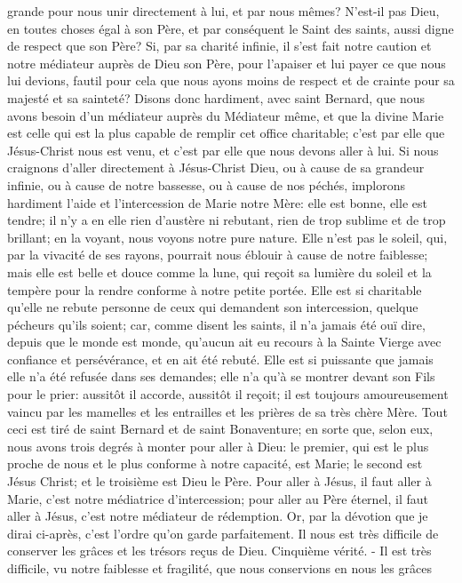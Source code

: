 grande pour nous unir directement à lui, et par nous mêmes? N'est-il pas Dieu, en toutes choses égal à son Père,
et par conséquent le Saint des saints, aussi digne de respect que son Père? Si, par sa charité infinie, il s'est fait
notre caution et notre médiateur auprès de Dieu son Père, pour l'apaiser et lui payer ce que nous lui devions, fautil pour cela que nous ayons moins de respect et de crainte pour sa majesté et sa sainteté?
Disons donc hardiment, avec saint Bernard, que nous avons besoin d'un médiateur auprès du Médiateur même, et
que la divine Marie est celle qui est la plus capable de remplir cet office charitable; c'est par elle que Jésus-Christ
nous est venu, et c'est par elle que nous devons aller à lui. Si nous craignons d'aller directement à Jésus-Christ
Dieu, ou à cause de sa grandeur infinie, ou à cause de notre bassesse, ou à cause de nos péchés, implorons
hardiment l'aide et l'intercession de Marie notre Mère: elle est bonne, elle est tendre; il n'y a en elle rien d'austère
ni rebutant, rien de trop sublime et de trop brillant; en la voyant, nous voyons notre pure nature. Elle n'est pas le
soleil, qui, par la vivacité de ses rayons, pourrait nous éblouir à cause de notre faiblesse; mais elle est belle et
douce comme la lune, qui reçoit sa lumière du soleil et la tempère pour la rendre conforme à notre petite portée.
Elle est si charitable qu'elle ne rebute personne de ceux qui demandent son intercession, quelque pécheurs qu'ils
soient; car, comme disent les saints, il n'a jamais été ouï dire, depuis que le monde est monde, qu'aucun ait eu
recours à la Sainte Vierge avec confiance et persévérance, et en ait été rebuté. Elle est si puissante que jamais
elle n'a été refusée dans ses demandes; elle n'a qu'à se montrer devant son Fils pour le prier: aussitôt il accorde,
aussitôt il reçoit; il est toujours amoureusement vaincu par les mamelles et les entrailles et les prières de sa très
chère Mère.
 Tout ceci est tiré de saint Bernard et de saint Bonaventure; en sorte que, selon eux, nous avons trois degrés à
monter pour aller à Dieu: le premier, qui est le plus proche de nous et le plus conforme à notre capacité, est Marie;
le second est Jésus Christ; et le troisième est Dieu le Père. Pour aller à Jésus, il faut aller à Marie, c'est notre
médiatrice d'intercession; pour aller au Père éternel, il faut aller à Jésus, c'est notre médiateur de rédemption. Or,
par la dévotion que je dirai ci-après, c'est l'ordre qu'on garde parfaitement.
Il nous est très difficile de conserver les grâces et les trésors reçus de Dieu.
 Cinquième vérité. - Il est très difficile, vu notre faiblesse et fragilité, que nous conservions en nous les grâces
